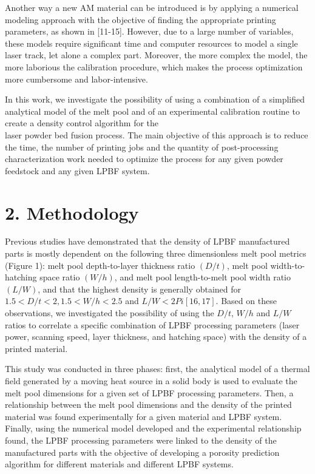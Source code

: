 \documentclass[10pt]{article}
\begin{document}
Another way a new AM material can be introduced is by applying a numerical modeling approach with the objective of finding the appropriate printing parameters, as shown in [11-15]. However, due to a large number of variables, these models require significant time and computer resources to model a single laser track, let alone a complex part. Moreover, the more complex the model, the more laborious the calibration procedure, which makes the process optimization more cumbersome and labor-intensive.

In this work, we investigate the possibility of using a combination of a simplified analytical model of the melt pool and of an experimental calibration routine to create a density control algorithm for the\\
laser powder bed fusion process. The main objective of this approach is to reduce the time, the number of printing jobs and the quantity of post-processing characterization work needed to optimize the process for any given powder feedstock and any given LPBF system.

\section*{2. Methodology}
Previous studies have demonstrated that the density of LPBF manufactured parts is mostly dependent on the following three dimensionless melt pool metrics (Figure 1): melt pool depth-to-layer thickness ratio $(D / t)$, melt pool width-to-hatching space ratio $(W / h)$, and melt pool length-to-melt pool width ratio $(L / W)$, and that the highest density is generally obtained for $1.5<D / t<2,1.5<W / h<2.5$ and $L / W<2 P i[16,17]$. Based on these observations, we investigated the possibility of using the $D / t$, $W / h$ and $L / W$ ratios to correlate a specific combination of LPBF processing parameters (laser power, scanning speed, layer thickness, and hatching space) with the density of a printed material.

This study was conducted in three phases: first, the analytical model of a thermal field generated by a moving heat source in a solid body is used to evaluate the melt pool dimensions for a given set of LPBF processing parameters. Then, a relationship between the melt pool dimensions and the density of the printed material was found experimentally for a given material and LPBF system. Finally, using the numerical model developed and the experimental relationship found, the LPBF processing parameters were linked to the density of the manufactured parts with the objective of developing a porosity prediction algorithm for different materials and different LPBF systems.
\end{document}
